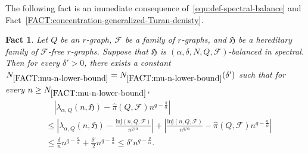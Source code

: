\documentclass[11pt,a4paper]{article}
\newtheorem{fact}[definition]{Fact}
\begin{document}
The following fact is an immediate consequence of~\eqref{equ:def-spectral-balance} and Fact~\ref{FACT:concentration-generalized-Turan-denisty}. 
%
\begin{fact}\label{FACT:mu-n-lower-bound}
    Let $Q$ be an $r$-graph, $\mathcal{F}$ be a family of $r$-graphs, and $\mathfrak{H}$ be a hereditary family of $\mathcal{F}$-free $r$-graphs. 
    Suppose that $\mathfrak{H}$ is $(\alpha, \delta, N, Q, \mathcal{F})$-balanced in spectral. Then for every $\delta' > 0$, there exists a constant $N_{\ref{FACT:mu-n-lower-bound}} = N_{\ref{FACT:mu-n-lower-bound}}(\delta')$ such that for every $n \ge N_{\ref{FACT:mu-n-lower-bound}}$, 
    \begin{align*}%
        & \quad \left|\lambda_{\alpha, Q}(n, \mathfrak{H}) - \hat{\pi}(Q,\mathcal{F}) n^{q - \frac{q}{\alpha}}\right| \\
        & \le \left|\lambda_{\alpha, Q}(n, \mathfrak{H}) - \frac{\mathrm{inj}(n,Q,\mathcal{F})}{n^{q/\alpha}} \right| + \left|\frac{\mathrm{inj}(n,Q,\mathcal{F})}{n^{q/\alpha}} - \hat{\pi}(Q,\mathcal{F}) n^{q - \frac{q}{\alpha}} \right| \\
        & \le \frac{\delta}{n} n^{q-\frac{q}{\alpha}} + \frac{\delta'}{2} n^{q - \frac{q}{\alpha}}
        \le \delta' n^{q - \frac{q}{\alpha}}. 
    \end{align*}
\end{fact}

\end{document}
